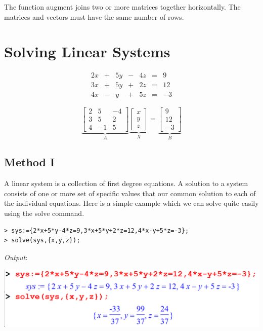 \documentclass[
]{book}
\theoremstyle{definition}
\theoremstyle{definition}
\theoremstyle{definition}
\theoremstyle{definition}
\theoremstyle{remark}
\begin{document}
The function augment joins two or more matrices together horizontally.
The matrices and vectors must have the same number of rows.

\section{Solving Linear Systems}\label{solving-linear-systems}

\[ \begin{array}{ccccccc} 
2x &+& 5y &-& 4z &=& 9 \\
3x &+& 5y &+& 2z &=& 12 \\
4x &-& y  &+& 5z &=& -3 
\end{array} \]

\[
\underbrace{\begin{bmatrix}
2 & 5 & -4 \\
3 & 5 & 2   \\
4 & -1 & 5  
\end{bmatrix}}_A
\underbrace{\begin{bmatrix}
x \\ y\\z
\end{bmatrix}}_X
=
\underbrace{\begin{bmatrix}
9\\12\\-3
\end{bmatrix}}_B
\]

\subsection{Method I}\label{method-i}

A linear system is a collection of first degree equations.
A solution to a system consists of one or more set of specific values that our common solution to each of the individual equations.
Here is a simple example which we can solve quite easily using the solve command.

\begin{verbatim}
> sys:={2*x+5*y-4*z=9,3*x+5*y+2*z=12,4*x-y+5*z=-3};
> solve(sys,{x,y,z});
\end{verbatim}

\emph{Output}:

\includegraphics{figures/Lessson 5/fig4.png}
\end{document}
